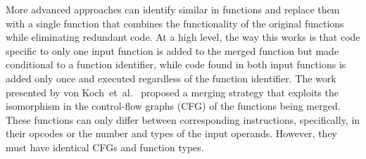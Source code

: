 More advanced approaches can identify similar in functions and replace them with a single function that combines the functionality of the original functions while eliminating redundant code.
At a high level, the way this works is that code specific to only one input function is added to the merged function but made conditional to a function identifier, while code found in both input functions is added only once and executed regardless of the function identifier.
The work presented by von Koch~et~al.~\cite{edler14} proposed a merging strategy that exploits the isomorphism in the control-flow graphs (CFG) of the functions being merged.
These functions can only differ between corresponding instructions, specifically, in their opcodes or the number and types of the input operands.
However, they must have identical CFGs and function types.





